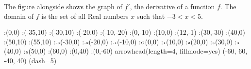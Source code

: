 \question The figure alongside shows the graph of $f'$, the derivative of a
function $f$. The domain of $f$ is the set of all Real numbers $x$ such that
$-3<x<5$.

  \begin{marginfigure}
      :(0,0)
      :(-35,10)
      :(-30,10)
      :(-20,0)
      :(-10,-20)
      :(0,-10)
      :(10,0)
      :(12,-1)
      :(30,-30)
      :(40,0)
      :(50,10)
      :(55,10)
      \def\Xmax{60}
      \def\Ymax{40}
      \def\Xmin{-60}
      \def\Ymin{-40}
      :$\tiny\text{-3}$(-30,0)
      :$\tiny\text{-2}$(-20,0)
      :$\tiny\text{-1}$(-10,0)
      :$\tiny\text{O}$(0,0)
      :$\tiny\text{1}$(10,0)
      :$\tiny\text{2}$(20,0)
      :$\tiny\text{3}$(30,0)
      :$\tiny\text{4}$(40,0)
      :$\tiny\text{5}$(50,0)
      :(60,0)
      :(0,40)
      :(0,-60)
    \figdrawbegin{}
      \figdrawcurve [15,20,30,40,50,61,70,80,90,95]
      \figset arrowhead(length=4, fillmode=yes)
      (\Xmin, \Xmax, \Ymin, \Ymax)
      \figset(dash=5)
      \figdrawline [201,20]
      \figdrawline [203,40]
      \figdrawline [207,70]
      \figdrawline [209,90]
    \figdrawend
    \centerline{\box\figBoxA}
  \end{marginfigure}

